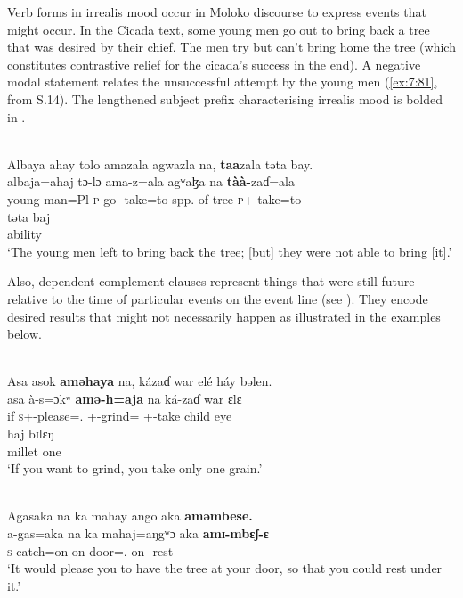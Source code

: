 Verb forms in irrealis mood occur in Moloko discourse to express events that might occur. In the Cicada text, some young men go out to bring back a tree that was desired by their chief. The men try but can’t bring home the tree (which constitutes contrastive relief for the cicada’s success in the end).  A negative modal statement relates the unsuccessful attempt by the young men (\ref{ex:7:81}, from S.14). The lengthened subject prefix characterising irrealis mood is bolded in . 

\ea\label{ex:7:81}\\
Albaya  ahay  tolo  amazala  agwazla  na,  \textbf{taa}zala  təta  bay.\\
\gll  albaja=ahaj  tɔ-lɔ     ama-z=ala   agʷaɮa        na  \textbf{tàà-}zaɗ=ala \\   
      {young man}=Pl       \textsc{p}-go  {\DEP}-take=to  {spp. of tree}  {\PSP}  \textsc{p}+{\HOR}-take=to \\ 
      
      \medskip
\gll təta  baj\\
     ability  {\NEG}\\
\glt  ‘The young men left to bring back the tree; [but] they were not able to bring [it].’\\
\z 

\newpage 
Also, dependent complement clauses represent things that were still future relative to the time of particular events on the event line (see ). They encode desired results that might not necessarily happen as illustrated in the examples below. 

\ea\label{ex:7:82}\\
Asa  asok  \textbf{aməhaya}  na,  kázaɗ  war  elé  háy  bəlen.\\
\gll  asa  à-s=ɔkʷ  \textbf{amə-h}\textbf{=aja} na  ká-zaɗ war ɛlɛ\\ 
      if \textsc{s}+{\PFV}-please={\twoS}.{\IO} {\DEP}+{\PFV}-grind={\PLU} {\PSP} {\twoS}+{\IFV}-take child eye\\ 
      
\medskip
\gll haj bɪlɛŋ\\
     millet  one\\
\glt  ‘If you want to grind, you take only one grain.’\\
\z


\ea\label{ex:7:83}\\
Agasaka  na  ka  mahay  ango  aka  \textbf{aməmbese.}\\
\gll  a-gas=aka      na  ka    mahaj=aŋgʷɔ         aka  \textbf{amɪ-mbɛʃ-ɛ}\\
      \textsc{s}-catch=on             {\PSP}  on    door={\twoS}.{\POSS}  on  {\DEP}-rest{}-{\CL}\\
\glt  ‘It would please you to have the tree at your door, so that you could rest under it.’ \\
\z 
{}

